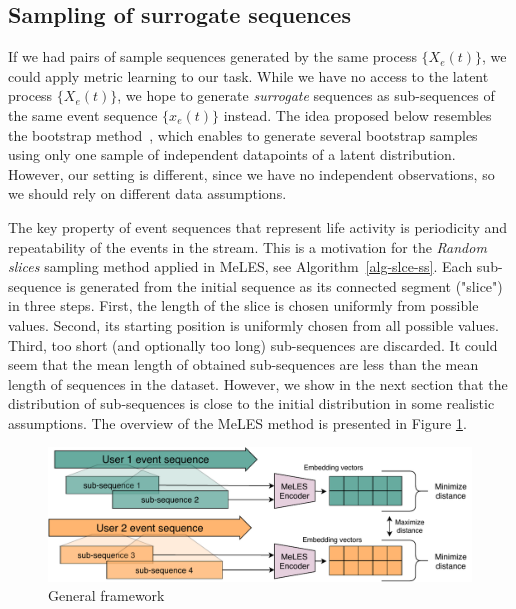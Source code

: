 \documentclass{article}
\begin{document}
\subsection{Sampling of surrogate sequences} \label{sec-pos-pairs}

If we had pairs of sample sequences generated by the same process $\{X_e(t)\}$, we could apply metric learning to our task. While we have no access to the latent process $\{X_e(t)\}$, we hope to generate \textit{surrogate} sequences as sub-sequences of the same event sequence $\{x_e(t)\}$ instead. The idea proposed below resembles the bootstrap method~\cite{Efron1994Bootstrap}, which enables to generate several bootstrap samples using only one sample of independent datapoints of a latent distribution. However, our setting is different, since we have no independent observations, so we should rely on different data assumptions. 


The key property of event sequences that represent life activity is periodicity and repeatability of the events in the stream. This is a motivation for the \textit{Random slices} sampling method applied in MeLES, see Algorithm~\ref{alg-slce-ss}. Each sub-sequence is generated from the initial sequence as its connected segment ("slice") in three steps. First, the length of the slice is chosen uniformly from possible values. Second, its starting position is uniformly chosen from all possible values. Third, too short (and optionally too long) sub-sequences are discarded. It could seem that the mean length of obtained sub-sequences are less than the mean length of sequences in the dataset. However, we show in the next section that the distribution of sub-sequences is close to the initial distribution in some realistic assumptions. The overview of the MeLES method is presented in Figure \ref{fig-arch}.


\begin{figure}[htbp]
  \includegraphics[width=\linewidth]{figures/arch-v2-narrow.pdf}
\caption{General framework}
  \label{fig-arch}
\end{figure}
\end{document}
